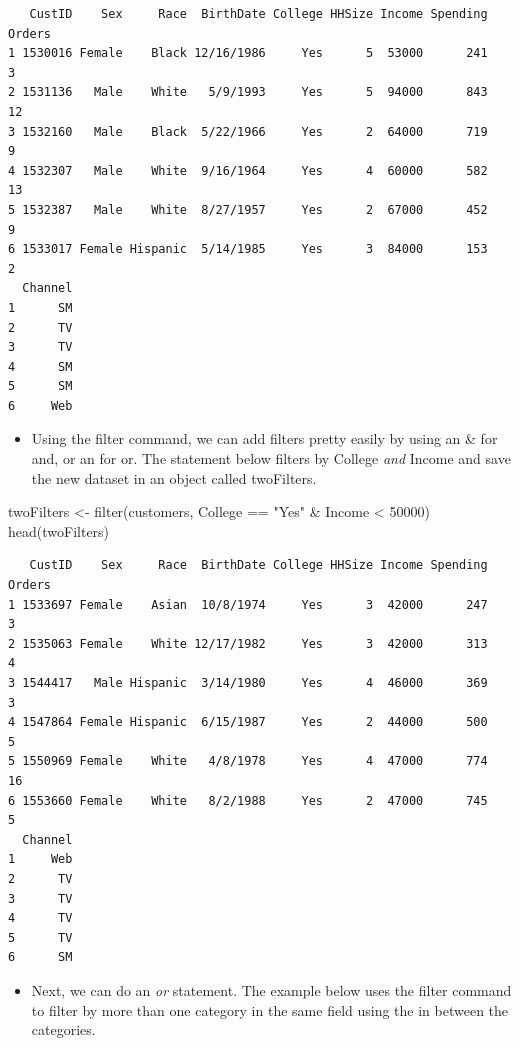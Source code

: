 \documentclass[
  letterpaper,
  DIV=11,
  numbers=noendperiod]{scrreprt}
\newenvironment{Shaded}{\begin{snugshade}}{\end{snugshade}}
\newcommand{\DecValTok}[1]{\textcolor[rgb]{0.68,0.00,0.00}{#1}}
\newcommand{\FunctionTok}[1]{\textcolor[rgb]{0.28,0.35,0.67}{#1}}
\newcommand{\NormalTok}[1]{\textcolor[rgb]{0.00,0.23,0.31}{#1}}
\newcommand{\OtherTok}[1]{\textcolor[rgb]{0.00,0.23,0.31}{#1}}
\newcommand{\SpecialCharTok}[1]{\textcolor[rgb]{0.37,0.37,0.37}{#1}}
\newcommand{\StringTok}[1]{\textcolor[rgb]{0.13,0.47,0.30}{#1}}
\providecommand{\tightlist}{%
  \setlength{\itemsep}{0pt}\setlength{\parskip}{0pt}}\usepackage{longtable,booktabs,array}
\begin{document}
\begin{verbatim}
   CustID    Sex     Race  BirthDate College HHSize Income Spending Orders
1 1530016 Female    Black 12/16/1986     Yes      5  53000      241      3
2 1531136   Male    White   5/9/1993     Yes      5  94000      843     12
3 1532160   Male    Black  5/22/1966     Yes      2  64000      719      9
4 1532307   Male    White  9/16/1964     Yes      4  60000      582     13
5 1532387   Male    White  8/27/1957     Yes      2  67000      452      9
6 1533017 Female Hispanic  5/14/1985     Yes      3  84000      153      2
  Channel
1      SM
2      TV
3      TV
4      SM
5      SM
6     Web
\end{verbatim}

\begin{itemize}
\tightlist
\item
  Using the filter command, we can add filters pretty easily by using an
  \& for and, or an \textbar{} for or. The statement below filters by
  College \emph{and} Income and save the new dataset in an object called
  twoFilters.
\end{itemize}

\begin{Shaded}
\begin{Highlighting}[]
\NormalTok{twoFilters }\OtherTok{\textless{}{-}} \FunctionTok{filter}\NormalTok{(customers, College }\SpecialCharTok{==} \StringTok{"Yes"} \SpecialCharTok{\&}\NormalTok{ Income }\SpecialCharTok{\textless{}} \DecValTok{50000}\NormalTok{)}
\FunctionTok{head}\NormalTok{(twoFilters)}
\end{Highlighting}
\end{Shaded}

\begin{verbatim}
   CustID    Sex     Race  BirthDate College HHSize Income Spending Orders
1 1533697 Female    Asian  10/8/1974     Yes      3  42000      247      3
2 1535063 Female    White 12/17/1982     Yes      3  42000      313      4
3 1544417   Male Hispanic  3/14/1980     Yes      4  46000      369      3
4 1547864 Female Hispanic  6/15/1987     Yes      2  44000      500      5
5 1550969 Female    White   4/8/1978     Yes      4  47000      774     16
6 1553660 Female    White   8/2/1988     Yes      2  47000      745      5
  Channel
1     Web
2      TV
3      TV
4      TV
5      TV
6      SM
\end{verbatim}

\begin{itemize}
\tightlist
\item
  Next, we can do an \emph{or} statement. The example below uses the
  filter command to filter by more than one category in the same field
  using the \textbar{} in between the categories.
\end{itemize}
\end{document}
